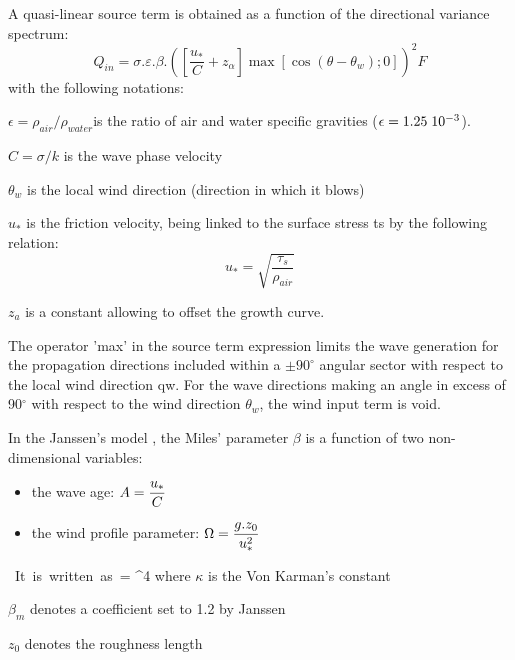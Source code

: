  A quasi-linear source term is obtained as a function of the directional variance spectrum:
\begin{equation} \label{GrindEQ__4_27_}
Q_{in} =\sigma .\varepsilon .\beta .\left(\left[\frac{u_{*} }{C} +z_{\alpha } \right]\max \left[\cos (\theta -\theta _{w} );0\right]\right)^{2} F
\end{equation}
with the following notations:

$ \epsilon = \rho_{air}/\rho_{water }$is the ratio of air and water specific gravities ($ \epsilon = 1.25\hspace{0.1cm}10^{-3}$).

 $C = \sigma/k$ is the wave phase velocity

 $\theta_w$ is the local wind direction (direction in which it blows)

 $u_*$ is the friction velocity, being linked to the surface stress ts by the following relation:
\begin{equation} \label{GrindEQ__4_28_}
u_{*} =\sqrt{\frac{\tau _{s} }{\rho _{air} } }
\end{equation}

 $z_a$ is a constant allowing to offset the growth curve.

 The operator 'max' in the source term expression limits the wave generation for the propagation directions included within a $\pm 90^\circ$ angular sector with respect to the local wind direction qw. For the wave directions making an angle in excess of 90${}^\circ$ with respect to the wind direction $\theta_w$, the wind input term is void.

 In the Janssen's model \cite{Janssen1991}, the Miles' parameter $\beta$ is a function of two non-dimensional variables:

\begin{itemize}
\item  the wave age:  $\displaystyle A=\frac{u_{*} }{C} $
\item  the wind profile parameter: $\displaystyle \Omega =\frac{g.z_{0} }{u_{*}^{2} } $
\end{itemize}
\bequ
\label{GrindEQ__4_29_}
\mbox{ It is written as }\beta = \mu \ln ^{4} \mu 
\eequ
 where $\kappa$ is the Von Karman's constant

 $\beta_m$ denotes a coefficient set to 1.2 by Janssen \cite{Janssen1991}

 $z_0$ denotes the roughness length

